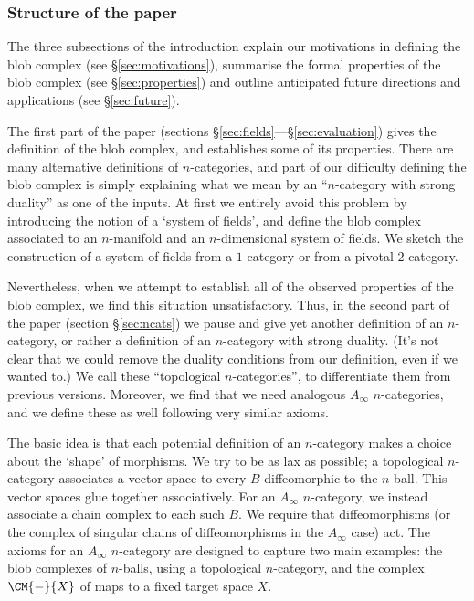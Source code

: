 \subsubsection{Structure of the paper}
The three subsections of the introduction explain our motivations in defining the blob complex (see \S \ref{sec:motivations}), summarise the formal properties of the blob complex (see \S \ref{sec:properties}) and outline anticipated future directions and applications (see \S \ref{sec:future}).

The first part of the paper (sections \S \ref{sec:fields}---\S \ref{sec:evaluation}) gives the definition of the blob complex, and establishes some of its properties. There are many alternative definitions of $n$-categories, and part of our difficulty defining the blob complex is simply explaining what we mean by an ``$n$-category with strong duality'' as one of the inputs. At first we entirely avoid this problem by introducing the notion of a `system of fields', and define the blob complex associated to an $n$-manifold and an $n$-dimensional system of fields. We sketch the construction of a system of fields from a $1$-category or from a pivotal $2$-category.

Nevertheless, when we attempt to establish all of the observed properties of the blob complex, we find this situation unsatisfactory. Thus, in the second part of the paper (section \S \ref{sec:ncats}) we pause and give yet another definition of an $n$-category, or rather a definition of an $n$-category with strong duality. (It's not clear that we could remove the duality conditions from our definition, even if we wanted to.) We call these ``topological $n$-categories'', to differentiate them from previous versions. Moreover, we find that we need analogous $A_\infty$ $n$-categories, and we define these as well following very similar axioms.

The basic idea is that each potential definition of an $n$-category makes a choice about the `shape' of morphisms. We try to be as lax as possible; a topological $n$-category associates a vector space to every $B$ diffeomorphic to the $n$-ball. This vector spaces glue together associatively. For an $A_\infty$ $n$-category, we instead associate a chain complex to each such $B$. We require that diffeomorphisms (or the complex of singular chains of diffeomorphisms in the $A_\infty$ case) act. The axioms for an $A_\infty$ $n$-category are designed to capture two main examples: the blob complexes of $n$-balls, using a topological $n$-category, and the complex $\CM{-}{X}$ of maps to a fixed target space $X$.

